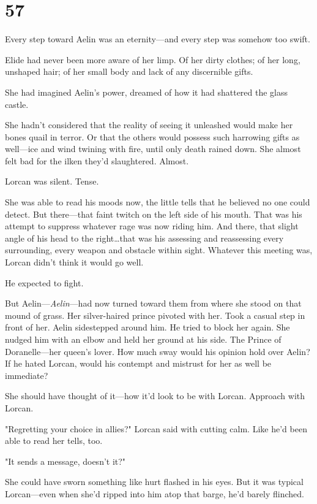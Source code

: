 
\chapter{57}

Every step toward Aelin was an eternity---and every step was somehow too swift.

Elide had never been more aware of her limp.
Of her dirty clothes; of her long, unshaped hair; of her small body and lack of any discernible gifts.

She had imagined Aelin's power, dreamed of how it had shattered the glass castle.

She hadn't considered that the reality of seeing it unleashed would make her bones quail in terror.
Or that the others would possess such harrowing gifts as well---ice and wind twining with fire, until only death rained down.
She almost felt bad for the ilken they'd slaughtered.
Almost.

Lorcan was silent.
Tense.

She was able to read his moods now, the little tells that he believed no one could detect.
But there---that faint twitch on the left side of his mouth.
That was his attempt to suppress whatever rage was now riding him.
And there, that slight angle of his head to the right\ldots that was his assessing and reassessing every surrounding, every weapon and obstacle within sight.
Whatever this meeting was, Lorcan didn't think it would go well.

He expected to fight.

But Aelin---\emph{Aelin}---had now turned toward them from where she stood on that mound of grass.
Her silver-haired prince pivoted with her.
Took a casual step in front of her.
Aelin sidestepped around him.
He tried to block her again.
She nudged him with an elbow and held her ground at his side.
The Prince of Doranelle---her queen's lover.
How much sway would his opinion hold over Aelin?
If he hated Lorcan, would his contempt and mistrust for her as well be immediate?

She should have thought of it---how it'd look to be with Lorcan.
Approach with Lorcan.

"Regretting your choice in allies?"
Lorcan said with cutting calm.
Like he'd been able to read her tells, too.

"It sends a message, doesn't it?"

She could have sworn something like hurt flashed in his eyes.
But it was typical Lorcan---even when she'd ripped into him atop that barge, he'd barely flinched.

